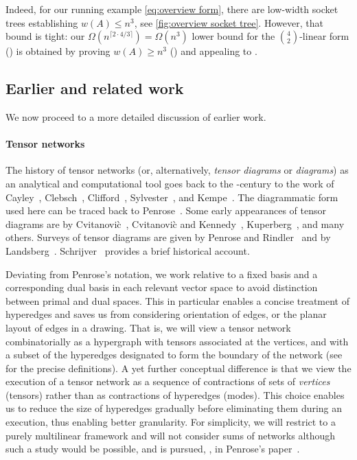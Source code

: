 Indeed, for our running example \eqref{eq:overview form}, there are
low-width socket trees establishing $w(A) \le n^3$, see
\eqref{fig:overview socket tree}.  However, that bound is tight: our
$\Omega(n^{\lceil 2 \cdot 4 / 3 \rceil}) = \Omega(n^3)$ lower bound
for the $\binom{4}{2}$-linear form ()
is obtained by proving $w(A) \ge n^3$ () and
appealing to .

\vspace{-0.5cm}


\subsection{Earlier and related work}
\label{sec:related work}

We now proceed to a more detailed discussion of earlier work.

\paragraph*{Tensor networks}

The history of tensor networks
(or, alternatively, \emph{tensor diagrams} or \emph{diagrams}) as
an analytical and computational tool goes back to the -century to
%
%
the work of %
Cayley~\cite{Cayley1875,Cayley1879}, Clebsch~\cite{Clebsch1861},
Clifford~\cite{Clifford1878}, Sylvester~\cite{Sylvester1878},
and Kempe~\cite{Kempe1885,Kempe1892}. The diagrammatic form used here can be
traced back to Penrose~\cite{Penrose1971}. Some early appearances of tensor
diagrams are by Cvitanovi\`c~\cite{Cvitanovic1976},
Cvitanovi\`c and Kennedy~\cite{CvitanovicK1982},
Kuperberg~\cite{Kuperberg1991}, and many others. Surveys of tensor
diagrams are given by Penrose and Rindler~\cite{PenroseR1986a} and
by Landsberg~\cite{Landsberg2012}. Schrijver~\cite{Schrijver2015a} provides
a brief historical account.

Deviating from Penrose’s notation, we work 
%
relative to a fixed basis %
and a corresponding dual basis in each relevant
vector space to avoid distinction between primal and dual spaces.
This in particular enables a concise treatment of hyperedges and saves us
from considering orientation of edges, or the planar layout of edges
in a drawing. That is, we will view a tensor network combinatorially as a
hypergraph with tensors associated at the vertices, and with a subset
of the hyperedges designated to form the
boundary of the network
(see~ %
for the
precise definitions). A yet further conceptual difference is that we view
the execution of a tensor network as a sequence of contractions
of sets of \emph{vertices} (tensors) rather than as contractions of
hyperedges (modes). This choice enables us to reduce the size of hyperedges
gradually before eliminating them during an execution, thus
enabling better granularity. For simplicity, we will restrict to
a purely multilinear framework and will not consider sums of networks
although such a study would be possible, and is pursued, \eg, in
Penrose's %
paper~\cite{Penrose1971}.  %

